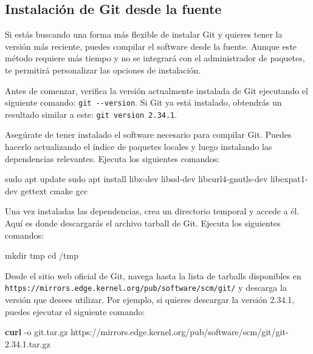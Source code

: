 \documentclass[
  a4paper,
]{article}
\newenvironment{Shaded}{}{}
\newcommand{\AttributeTok}[1]{\textcolor[rgb]{0.84,0.23,0.29}{#1}}
\newcommand{\BuiltInTok}[1]{\textcolor[rgb]{0.84,0.23,0.29}{#1}}
\newcommand{\ExtensionTok}[1]{\textcolor[rgb]{0.84,0.23,0.29}{\textbf{#1}}}
\newcommand{\FunctionTok}[1]{\textcolor[rgb]{0.44,0.26,0.76}{#1}}
\newcommand{\NormalTok}[1]{\textcolor[rgb]{0.14,0.16,0.18}{#1}}
\begin{document}
\subsection{Instalación de Git desde la
fuente}\label{instalaciuxf3n-de-git-desde-la-fuente}

Si estás buscando una forma más flexible de instalar Git y quieres tener
la versión más reciente, puedes compilar el software desde la fuente.
Aunque este método requiere más tiempo y no se integrará con el
administrador de paquetes, te permitirá personalizar las opciones de
instalación.

Antes de comenzar, verifica la versión actualmente instalada de Git
ejecutando el siguiente comando: \texttt{git\ -\/-version}. Si Git ya
está instalado, obtendrás un resultado similar a este:
\texttt{git\ version\ 2.34.1}.

Asegúrate de tener instalado el software necesario para compilar Git.
Puedes hacerlo actualizando el índice de paquetes locales y luego
instalando las dependencias relevantes. Ejecuta los siguientes comandos:

\begin{Shaded}
\begin{Highlighting}[]
\FunctionTok{sudo}\NormalTok{ apt update}
\FunctionTok{sudo}\NormalTok{ apt install libz{-}dev libssl{-}dev libcurl4{-}gnutls{-}dev libexpat1{-}dev gettext cmake gcc}
\end{Highlighting}
\end{Shaded}

Una vez instaladas las dependencias, crea un directorio temporal y
accede a él. Aquí es donde descargarás el archivo tarball de Git.
Ejecuta los siguientes comandos:

\begin{Shaded}
\begin{Highlighting}[]
\FunctionTok{mkdir}\NormalTok{ tmp}
\BuiltInTok{cd}\NormalTok{ /tmp}
\end{Highlighting}
\end{Shaded}

Desde el sitio web oficial de Git, navega hasta la lista de tarballs
disponibles en
\texttt{https://mirrors.edge.kernel.org/pub/software/scm/git/} y
descarga la versión que desees utilizar. Por ejemplo, si quieres
descargar la versión 2.34.1, puedes ejecutar el siguiente comando:

\begin{Shaded}
\begin{Highlighting}[]
\ExtensionTok{curl} \AttributeTok{{-}o}\NormalTok{ git.tar.gz https://mirrors.edge.kernel.org/pub/software/scm/git/git{-}2.34.1.tar.gz}
\end{Highlighting}
\end{Shaded}
\end{document}
